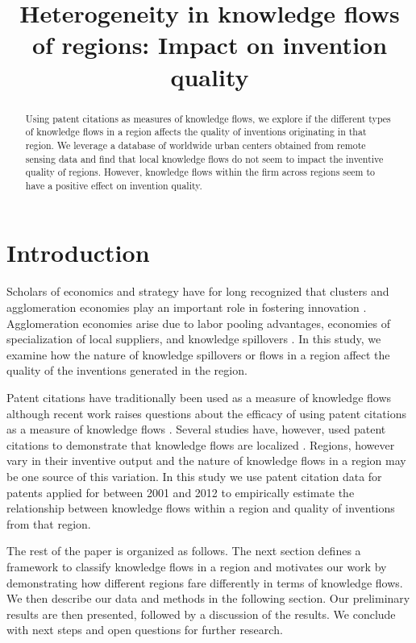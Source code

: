 \documentclass[parskip=full,10pt,letterpaper]{article}
\begin{document}
\singlespacing
\setlength{\droptitle}{-5em}
\title{\textbf{\large Heterogeneity in knowledge flows of regions: Impact on invention quality}}
\date{\vspace{-12ex}}

\maketitle
\thispagestyle{empty}
\renewcommand{\abstractname}{\large Abstract}
\begin{abstract}
\normalsize
\noindent Using patent citations as measures of knowledge flows, we explore if the different types of knowledge flows in a region affects the quality of inventions originating in that region. We leverage a database of worldwide urban centers  obtained from remote sensing data and find that  local knowledge flows  do not seem to impact the inventive quality of regions. However, knowledge flows within the firm across regions seem to have a positive effect on invention quality.
\end{abstract}

\section*{Introduction}
Scholars of economics and strategy have for long recognized that clusters and agglomeration economies play an important role in fostering innovation \citep{Marshall1890, Porter1990}. Agglomeration economies arise due to labor pooling advantages, economies of specialization of local suppliers, and knowledge spillovers \citep{Porter1990, Krugman1991}. In this study, we examine how the nature of knowledge spillovers or flows in a region affect the quality of the inventions generated in the region.\par
Patent citations have traditionally been used as a  measure of knowledge flows \citep{Jaffe1993} although recent work raises questions about the efficacy of using patent citations as a measure of knowledge flows \citep{Arora2017}. Several studies have, however, used patent citations to demonstrate that knowledge flows are localized \citep{Jaffe1993, Almeida1999, Alcacer2006a}. Regions, however vary in their inventive output \citep{Agrawal2014} and the nature of knowledge flows in a region may be one source of this variation. In this study we use patent citation data for patents applied for between 2001 and 2012 to empirically estimate the relationship between knowledge flows within a region and quality of inventions from that region. \par
The rest of the paper is organized as follows. The next section defines a framework to classify knowledge flows in a region and motivates our work by demonstrating how different regions fare differently in terms of knowledge flows. We then describe our data and methods in the following section. Our preliminary results are then presented, followed by a discussion of the results. We conclude with next steps and open questions for further research.
\end{document}
